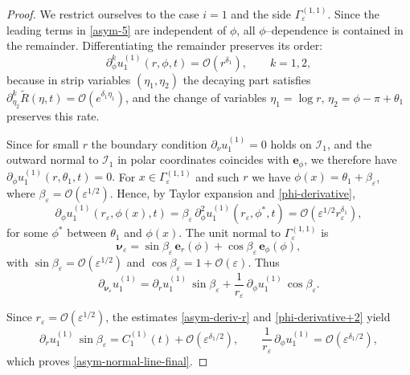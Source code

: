 \documentclass[reqno]{amsart}            %
\numberwithin{equation}{section}
\begin{document}
	\begin{proof}
		We restrict ourselves to the case $i = 1$ and the side $\Gamma_\varepsilon^{(1,1)}.$ 
		Since the leading terms in \eqref{asym-5} are independent of $\phi$, all
		$\phi$–dependence is contained in the remainder. Differentiating the remainder
		preserves its order:
		\begin{equation}\label{phi-derivative}
			\partial_\phi^k u^{(1)}_1(r,\phi,t)
			= \mathcal{O}\!\left(r^{\delta_1}\right),
			\qquad k=1,2,
		\end{equation}
		because in strip variables $(\eta_1,\eta_2)$ the decaying part satisfies
		$\partial_{\eta_2}^k \widetilde{R}(\eta,t)=\mathcal{O}(e^{\delta_1\eta_1})$, and
		the change of variables $\eta_1=\log r$, $\eta_2=\phi-\pi+\theta_1$ preserves
		this rate.
		
		Since for small $r$ the boundary condition $\partial_\nu u^{(1)}_1=0$ holds on
		$\mathcal{I}_1$, and the outward normal to $\mathcal{I}_1$ in polar coordinates
		coincides with $\mathbf e_\phi$, we therefore have
		$
		\partial_\phi u^{(1)}_1(r,\theta_1,t)=0.
		$
		For $x\in \Gamma_\varepsilon^{(1,1)}$ and such $r$ we have $\phi(x)=\theta_1+\beta_\varepsilon$, where
		$\beta_\varepsilon=\mathcal{O}(\varepsilon^{1/2})$. Hence, by Taylor expansion and \eqref{phi-derivative},
		\begin{equation}\label{phi-derivative+2}
			\partial_\phi u^{(1)}_1(r_\varepsilon,\phi(x),t)
			= \beta_\varepsilon\,\partial^2_{\phi} u^{(1)}_1(r_\varepsilon,\phi^*,t)
			= \mathcal{O}\!\left(\varepsilon^{1/2} r_\varepsilon^{\delta_1}\right),
		\end{equation}
		for some $\phi^*$ between $\theta_1$ and $\phi(x)$. 
		The unit normal to $\Gamma_\varepsilon^{(1,1)}$ is
		\[
		\boldsymbol{\nu}_\varepsilon
		= \sin\beta_\varepsilon\,\mathbf e_r(\phi)
		+ \cos\beta_\varepsilon\,\mathbf e_\phi(\phi),
		\]
		with $\sin\beta_\varepsilon=\mathcal{O}(\varepsilon^{1/2})$ and
		$\cos\beta_\varepsilon=1+\mathcal{O}(\varepsilon)$.
		Thus
		\[
		\partial_{\boldsymbol{\nu}_\varepsilon} u^{(1)}_1
		= \partial_r u^{(1)}_1\,\sin\beta_\varepsilon
		+ \frac{1}{r_\varepsilon}\,\partial_\phi u^{(1)}_1\,\cos\beta_\varepsilon.
		\]
		
		Since $r_\varepsilon=\mathcal{O}(\varepsilon^{1/2})$, the estimates
		\eqref{asym-deriv-r} and \eqref{phi-derivative+2} yield
		\[
		\partial_r u^{(1)}_1\,\sin\beta_\varepsilon
		= C^{(1)}_1(t) + \mathcal{O}\!\left(\varepsilon^{\delta_1/2}\right),
		\qquad
		\frac{1}{r_\varepsilon}\,\partial_\phi u^{(1)}_1
		= \mathcal{O}\!\left(\varepsilon^{\delta_1/2}\right),
		\]
		which proves \eqref{asym-normal-line-final}.
	\end{proof}
	
\end{document}
